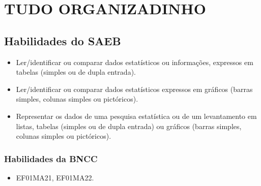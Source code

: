 \chapter{TUDO ORGANIZADINHO}


\section{Habilidades do SAEB}

\begin{itemize}
\item Ler/identificar ou comparar dados estatísticos ou informações,
expressos em tabelas (simples ou de dupla entrada).

\item Ler/identificar ou comparar dados estatísticos expressos em gráficos
(barras simples, colunas simples ou pictóricos).

\item Representar os dados de uma pesquisa estatística ou de um levantamento
em listas, tabelas (simples ou de dupla entrada) ou gráficos (barras
simples, colunas simples ou pictóricos).
\end{itemize}

\subsection{Habilidades da BNCC}

\begin{itemize}
\item EF01MA21, EF01MA22.
\end{itemize}


